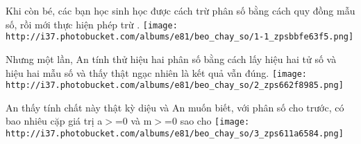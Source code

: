 Khi còn bé, các bạn học sinh học được cách trừ phân số bằng cách quy đồng mẫu số, rồi mới thực hiện phép trừ      .   
\texttt{[image: http://i37.photobucket.com/albums/e81/beo\_chay\_so/1-1\_zpsbbfe63f5.png]}

    Nhưng một lần, An tính thử hiệu hai phân số bằng cách lấy hiệu hai tử số và hiệu hai mẫu số và thấy thật ngạc nhiên là kết quả vẫn đúng.    
\texttt{[image: http://i37.photobucket.com/albums/e81/beo\_chay\_so/2\_zps662f8985.png]}

     An thấy tính chất này thật kỳ diệu và An muốn biết, với phân số         cho trước, có bao nhiêu cặp giá trị         a$>$=0 và m$>$=0         sao cho     
\texttt{[image: http://i37.photobucket.com/albums/e81/beo\_chay\_so/3\_zps611a6584.png]}